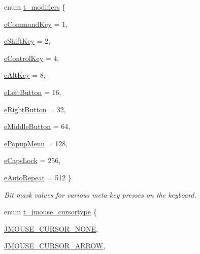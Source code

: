 \begin{DoxyCompactItemize}
\item 
enum \hyperlink{group__jmouse_gae6e0f3193b01069c1bce512ab787a681}{t\_\-modifiers} \{ \par
\hyperlink{group__jmouse_ggae6e0f3193b01069c1bce512ab787a681af8f7d9a027fb95ebf4c5422af789cb43}{eCommandKey} =  1, 
\par
\hyperlink{group__jmouse_ggae6e0f3193b01069c1bce512ab787a681a7ce9f8e318648eef4ca2c0cdcf02d388}{eShiftKey} =  2, 
\par
\hyperlink{group__jmouse_ggae6e0f3193b01069c1bce512ab787a681aed96b885e30356b4fe9fa683bc7642a5}{eControlKey} =  4, 
\par
\hyperlink{group__jmouse_ggae6e0f3193b01069c1bce512ab787a681aa397f65aeb5383d87df9e9a6aac41f3d}{eAltKey} =  8, 
\par
\hyperlink{group__jmouse_ggae6e0f3193b01069c1bce512ab787a681a8e53fc2f0be6a158661347c272ac99dc}{eLeftButton} =  16, 
\par
\hyperlink{group__jmouse_ggae6e0f3193b01069c1bce512ab787a681ac8bf4c23189562374f313fd943394f7a}{eRightButton} =  32, 
\par
\hyperlink{group__jmouse_ggae6e0f3193b01069c1bce512ab787a681af5275c58c907c6732c257cac8ba8f56f}{eMiddleButton} =  64, 
\par
\hyperlink{group__jmouse_ggae6e0f3193b01069c1bce512ab787a681aeb8f2adab43f90b789abfec48c1b7ae0}{ePopupMenu} =  128, 
\par
\hyperlink{group__jmouse_ggae6e0f3193b01069c1bce512ab787a681aa20bd26db483cff1f37697899767fdb3}{eCapsLock} =  256, 
\par
\hyperlink{group__jmouse_ggae6e0f3193b01069c1bce512ab787a681a5d0dfbd38a8045f96ba1c9f66bfc270b}{eAutoRepeat} =  512
 \}
\begin{DoxyCompactList}\small\item\em Bit mask values for various meta-\/key presses on the keyboard. \item\end{DoxyCompactList}\item 
enum \hyperlink{group__jmouse_ga4d6e7dd3d4d260c28f3bce9b9f36f764}{t\_\-jmouse\_\-cursortype} \{ \par
\hyperlink{group__jmouse_gga4d6e7dd3d4d260c28f3bce9b9f36f764a7e469e4eae58ff8ba0e04c05e7d01e27}{JMOUSE\_\-CURSOR\_\-NONE}, 
\par
\hyperlink{group__jmouse_gga4d6e7dd3d4d260c28f3bce9b9f36f764ac8245af5ede8e5566629f1a56b07be79}{JMOUSE\_\-CURSOR\_\-ARROW}, 
\par

\end{DoxyCompactItemize}

